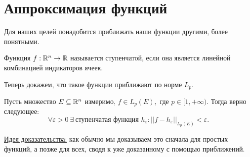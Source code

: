 \section{Аппроксимация функций}

Для наших целей понадобится приближать наши функции другими, более понятными.

\begin{definition}
    Функция $f : \mathbb{R}^{n} \rightarrow \mathbb{R}$ называется ступенчатой, если она является линейной комбинацией индикаторов ячеек.
\end{definition}

Теперь докажем, что такое функции приближают по норме $L_p.$

\begin{theorem}
    Пусть множество $E \subseteq \mathbb{R}^n$ измеримо, $f \in L_p(E), $ где $p \in [1, +\infty).$ Тогда верно следующее:
    $$\forall \varepsilon > 0 \ \exists \ \text{ступенчатая функция } h_{\varepsilon} : ||f - h_{\varepsilon}||_{L_p(E)} < \varepsilon.$$
\end{theorem}

\underline{Идея доказательства:} как обычно мы доказываем это сначала для простых функций, а позже для всех, сводя к уже доказанному с помощью приближений.

